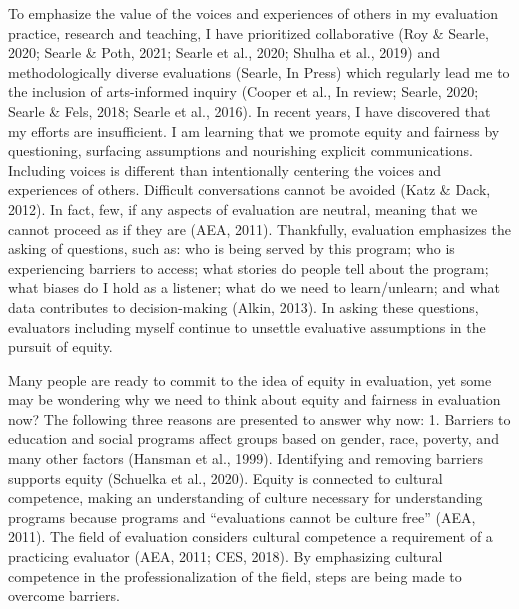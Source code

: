 \documentclass[
]{book}
\begin{document}
To emphasize the value of the voices and experiences of others in my evaluation practice, research and teaching, I have prioritized collaborative (Roy \& Searle, 2020; Searle \& Poth, 2021; Searle et al., 2020; Shulha et al., 2019) and methodologically diverse evaluations (Searle, In Press) which regularly lead me to the inclusion of arts-informed inquiry (Cooper et al., In review; Searle, 2020; Searle \& Fels, 2018; Searle et al., 2016). In recent years, I have discovered that my efforts are insufficient. I am learning that we promote equity and fairness by questioning, surfacing assumptions and nourishing explicit communications. Including voices is different than intentionally centering the voices and experiences of others. Difficult conversations cannot be avoided (Katz \& Dack, 2012). In fact, few, if any aspects of evaluation are neutral, meaning that we cannot proceed as if they are (AEA, 2011). Thankfully, evaluation emphasizes the asking of questions, such as: who is being served by this program; who is experiencing barriers to access; what stories do people tell about the program; what biases do I hold as a listener; what do we need to learn/unlearn; and what data contributes to decision-making (Alkin, 2013). In asking these questions, evaluators including myself continue to unsettle evaluative assumptions in the pursuit of equity.

Many people are ready to commit to the idea of equity in evaluation, yet some may be wondering why we need to think about equity and fairness in evaluation now? The following three reasons are presented to answer why now:
1. Barriers to education and social programs affect groups based on gender, race, poverty, and many other factors (Hansman et al., 1999). Identifying and removing barriers supports equity (Schuelka et al., 2020). Equity is connected to cultural competence, making an understanding of culture necessary for understanding programs because programs and ``evaluations cannot be culture free'' (AEA, 2011). The field of evaluation considers cultural competence a requirement of a practicing evaluator (AEA, 2011; CES, 2018). By emphasizing cultural competence in the professionalization of the field, steps are being made to overcome barriers.
\end{document}
